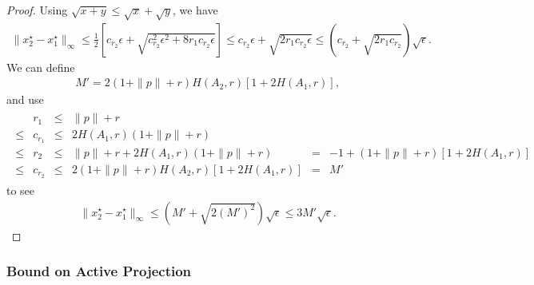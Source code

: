 \documentclass{article}
\newcounter{criteriacounter}
\newenvironment{criteria}[1][]{\refstepcounter{criteriacounter}\par\medskip
\textbf{Criteria \thecriteriacounter} \rmfamily \itshape}{\medskip}
\newtheorem{definition}[theorem]{Definition}
\newtheorem{lemma}[theorem]{Lemma}
\theoremstyle{case}
\numberwithin{theorem}{subsection}
\newcommand{\dk}{\Delta_k}
\newcommand{\naturals}{\mathbb N}
\newcommand{\xk}{x^{(k)}}
\newcommand{\xl}{{x^{(l)}}}
\begin{document}
\begin{proof}
Using $\sqrt{x + y} \le \sqrt{x} + \sqrt{y}$, we have
\begin{align*}
\|x_2^{\star} - x_1^{\star}\|_{\infty} \le \frac 1 2 \left[c_{r_2}\epsilon + \sqrt{c_{r_2}^2\epsilon^2 + 8r_1c_{r_2}\epsilon}\right] 
\le c_{r_2}\epsilon + \sqrt{2r_1c_{r_2}\epsilon}
\le \left(c_{r_2} + \sqrt{2r_1c_{r_2}}\right)\sqrt{\epsilon}.
\end{align*}
We can define 
\begin{align*}
M' = 2 \left(1 + \|p\| + r\right) H\left(A_2, r\right) \left[1 + 2H(A_1, r)\right],
\end{align*}
and use
\begin{align*}
\begin{array}{cccccl}
& r_1     &\le& \|p\| + r 													& &	\\
\le & c_{r_1} &\le& 2H\left(A_1, r\right)\left(1 + \|p\| + r\right) 				& &	\\
\le & r_2     &\le&  \|p\| + r + 2H\left(A_1, r\right)\left(1 + \|p\| + r\right) 	&=&-1 + \left(1 + \|p\| + r\right)\left[1 + 2H(A_1, r)\right]\\
\le & c_{r_2} &\le& 2 \left(1 + \|p\| + r\right) H\left(A_2, r\right) \left[1 + 2H(A_1, r)\right] &=& M'
\end{array}
\end{align*}
to see
\begin{align*}
\|x_2^{\star} - x_1^{\star}\|_{\infty} \le \left(M' + \sqrt{2\left(M'\right)^2}\right)\sqrt{\epsilon} \le 3M'\sqrt{\epsilon}.
\end{align*}

\end{proof}




\subsubsection{Bound on Active Projection}
\label{bounding_the_difference_in_the_active_projection}



% 
\end{document}

